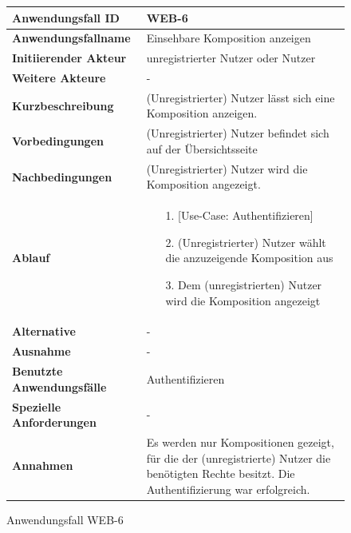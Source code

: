 \begin{figure}[h]
	\centering
	\begin{tabularx}{\textwidth}{ X | X }
		\textbf{Anwendungsfall ID} & WEB-6 \\ \hline
		\textbf{Anwendungsfallname} & Einsehbare Komposition anzeigen \\ \hline
		\textbf{Initiierender Akteur} & unregistrierter Nutzer oder Nutzer\\ \hline
		\textbf{Weitere Akteure} & - \\ \hline
		\textbf{Kurzbeschreibung} & (Unregistrierter) Nutzer  lässt sich eine Komposition anzeigen. \\ \hline
		\textbf{Vorbedingungen} & (Unregistrierter) Nutzer befindet sich auf der Übersichtsseite \\ \hline
		\textbf{Nachbedingungen} & (Unregistrierter) Nutzer wird die Komposition angezeigt. \\ \hline
		\textbf{Ablauf} &
		\begin{enumerate}
			\item[1.] [Use-Case: Authentifizieren]
			\item[2.] (Unregistrierter) Nutzer wählt die anzuzeigende Komposition aus
			\item[3.] Dem (unregistrierten) Nutzer wird die Komposition angezeigt
		\end{enumerate} \\ \hline
		\textbf{Alternative} & - \\ \hline
		\textbf{Ausnahme} & - \\ \hline
		\textbf{Benutzte Anwendungsfälle} & Authentifizieren \\ \hline
		\textbf{Spezielle Anforderungen} & - \\ \hline
		\textbf{Annahmen} & Es werden nur Kompositionen gezeigt, für die der (unregistrierte) Nutzer die benötigten Rechte besitzt. Die Authentifizierung war erfolgreich.
	\end{tabularx}
	\caption{Anwendungsfall WEB-6}
	\label{fig:anwendungsfall-server-tabelle-web-6}
\end{figure}
